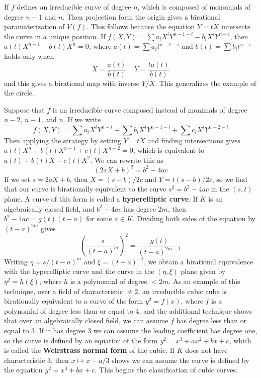 \begin{example}
    If $f$ defines an irreducible curve of degree $n$, which is composed of monomials of degree $n-1$ and $n$. Then projection form the origin gives a birational paramaterization of $V(f)$. This follows because the equation $Y = tX$ intersects the curve in a unique position. If $f(X,Y) = \sum a_i X^iY^{n-1-i} - b_i X^iY^{n-i}$, then $a(t) X^{n-1} - b(t) X^n = 0$, where $a(t) = \sum a_i t^{n-1-i}$ and $b(t) = \sum b_i t^{n-i}$ holds only when
    \[  X = \frac{a(t)}{b(t)}\ \ \ \ \ Y = \frac{ta(t)}{b(t)} \]
    and this gives a birational map with inverse $Y/X$. This generalizes the example of the circle.
\end{example}

\begin{example}
    Suppose that $f$ is an irreducible curve composed instead of monimals of degree $n-2$, $n-1$, and $n$. If we write
    \[ f(X,Y) = \sum a_i X^iY^{n-i} + \sum b_i X^iY^{n-1-i} + \sum c_i X^iY^{n-2-i}  \]
    Then applying the strategy by setting $Y = tX$ and finding intersections gives $a(t) X^n + b(t) X^{n-1} + c(t) X^{n-2} = 0$, which is equivalent to $a(t) + b(t)X + c(t)X^2$. We can rewrite this as
    \[ \left( 2aX + b \right)^2 = b^2 - 4ac \]
    If we set $s = 2aX + b$, then $X = (s-b)/2c$ and $Y = t(s-b)/2c$, so we find that our curve is birationally equivalent to the curve $s^2 = b^2 - 4ac$ in the $(s,t)$ plane. A curve of this form is called a {\bf hyperelliptic curve}. If $K$ is an algebraically closed field, and $b^2 - 4ac$ has degree $2m$, then $b^2 - 4ac = g(t)(t - a)$ for some $a \in K$. Dividing both sides of the equation by $(t-a)^{2m}$ gives
    \[ \left( \frac{s}{(t-a)^m} \right)^2 = \frac{g(t)}{(t-a)^{2m-1}} \]
    Writing $\eta = s/(t-a)^m$ and $\xi = (t-a)^{-1}$, we obtain a birational equivalence with the hyperelliptic curve and the curve in the $(\eta, \xi)$ plane given by $\eta^2 = h(\xi)$, where $h$ is a polynomial of degree $< 2m$. As an example of this technique, over a field of characteristic $\neq 2$, an irreducible cubic cube is birationally equivalent to a curve of the form $y^2 = f(x)$, where $f$ is a polynomial of degree less than or equal to 4, and the additional technique shows that over an algebraically closed field, we can assume $f$ has degree less than or equal to 3. If it has degree 3 we can assume the leading coefficient has degree one, so the curve is defined by an equation of the form $y^2 = x^3 + ax^2 + bx + c$, which is called the {\bf Weirstrass normal form} of the cubic. If $K$ does not have characteristic 3, then $x \mapsto x - a/3$ shows we can assume the curve is defined by the equation $y^2 = x^3 + bx + c$. This begins the classification of cubic curves.
\end{example}

